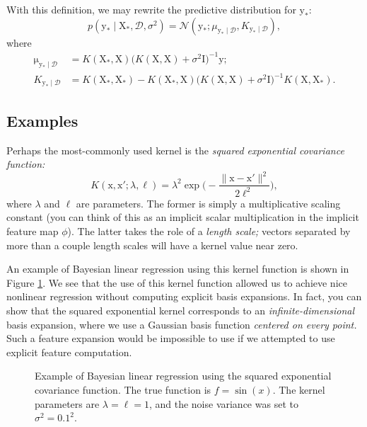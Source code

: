 \documentclass{article}
\newcommand{\given}{\mid}
\newcommand{\mc}[1]{\mathcal{#1}}
\newcommand{\data}{\mc{D}}
\newcommand{\inv}{^{-1}}
\newcommand{\mat}[1]{\bm{\mathrm{#1}}}
\renewcommand{\vec}[1]{\bm{\mathrm{#1}}}
\begin{document}
With this definition, we may rewrite the predictive distribution
for $\vec{y}_\ast$:
\begin{equation*}
  p(\vec{y}_\ast \given \mat{X}_\ast, \data, \sigma^2)
  =
  \mc{N}(
  \vec{y}_\ast;
  \mu_{\vec{y}_\ast \given \data},
  K_{\vec{y}_\ast \given \data}),
\end{equation*}
where
\begin{align*}
  \vec{\mu}_{\vec{y}_\ast\given\data}
  &=
  K(\mat{X}_\ast, \mat{X})
  \bigl(K(\mat{X}, \mat{X}) + \sigma^2 \mat{I}\bigr)\inv
  \vec{y};
  \\
  K_{\vec{y}_\ast\given\data}
  &=
  K(\vec{X}_\ast, \vec{X}_\ast)
  -
  K(\mat{X}_\ast, \mat{X})
  \bigl(K(\mat{X}, \mat{X}) + \sigma^2 \mat{I}\bigr)\inv
  K(\mat{X}, \mat{X}_\ast).
\end{align*}

\subsection*{Examples}

Perhaps the most-commonly used kernel is the \emph{squared exponential
  covariance function:}
\begin{equation*}
  K(\vec{x}, \vec{x}'; \lambda, \ell)
  =
  \lambda^2
  \exp\biggl(-\frac{\lVert \vec{x} - \vec{x}' \rVert^2}{2\ell^2}\biggr),
\end{equation*}
where $\lambda$ and $\ell$ are parameters.  The former is simply a
multiplicative scaling constant (you can think of this as an implicit
scalar multiplication in the implicit feature map $\phi$).  The latter
takes the role of a \emph{length scale;} vectors separated by more
than a couple length scales will have a kernel value near zero.

An example of Bayesian linear regression using this kernel function is
shown in Figure \ref{kernel_example}.  We see that the use of this
kernel function allowed us to achieve nice nonlinear regression
without computing explicit basis expansions.  In fact, you can show
that the squared exponential kernel corresponds to an
\emph{infinite-dimensional} basis expansion, where we use a Gaussian
basis function \emph{centered on every point.}  Such a feature
expansion would be impossible to use if we attempted to use explicit
feature computation.

\begin{figure}
  \centering
  
  \caption{Example of Bayesian linear regression using the squared
    exponential covariance function.  The true function is $f =
    \sin(x)$.  The kernel parameters are $\lambda = \ell = 1$, and the
    noise variance was set to $\sigma^2 = 0.1^2$.}
  \label{kernel_example}
\end{figure}
\end{document}
